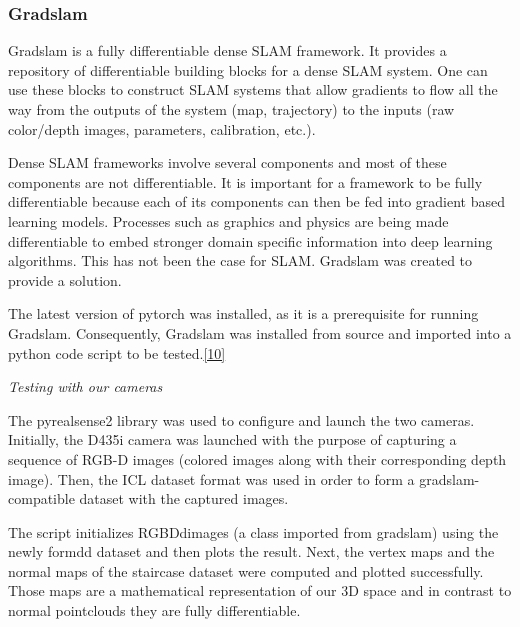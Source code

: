 \documentclass{article}
\begin{document}
\subsubsection{Gradslam}

Gradslam is a fully differentiable dense SLAM framework. It provides a repository of differentiable building blocks for a dense SLAM system. One can use these blocks to construct SLAM systems that allow gradients to flow all the way from the outputs of the system (map, trajectory) to the inputs (raw color/depth images, parameters, calibration, etc.).

Dense SLAM frameworks involve several components and most of these components are not differentiable. It is important for a framework to be fully differentiable because each of its components can then be fed into gradient based learning models. Processes such as graphics and physics are being made differentiable to embed stronger domain specific information into deep learning algorithms. This has not been the case for SLAM. Gradslam was created to provide a solution.

The latest version of pytorch was installed, as it is a prerequisite for running Gradslam. Consequently, Gradslam was installed from source and imported into a python code script to be tested.\href{https://gradslam.readthedocs.io/en/latest/tutorials/tutorial_prerequisits.html}{[10]}

\bigskip
\textit{Testing with our cameras}
\bigskip

The pyrealsense2 library was used to configure and launch the two cameras. Initially, the D435i camera was launched with the purpose of capturing a sequence of RGB-D images (colored images along with their corresponding depth image). Then, the ICL dataset format was used in order to form a gradslam-compatible dataset with the captured images. 

The script initializes RGBDdimages (a class imported from gradslam) using the newly formdd dataset and then plots the result. Next, the vertex maps and the normal maps of the staircase dataset were computed and plotted successfully. Those maps are a mathematical representation of our 3D space and in contrast to normal pointclouds they are fully differentiable.
\end{document}
